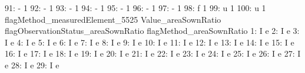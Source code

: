 \documentclass[nojss]{jss}
\begin{document}
\begin{Schunk}
\begin{Soutput}
 91:                               -                   1
 92:                               -                   1
 93:                               -                   1
 94:                               -                   1
 95:                               -                   1
 96:                               -                   1
 97:                               -                   1
 98:                               f                   1
 99:                               u                   1
100:                               u                   1
     flagMethod_measuredElement_5525 Value_areaSownRatio
     flagObservationStatus_areaSownRatio flagMethod_areaSownRatio
  1:                                   I                        e
  2:                                   I                        e
  3:                                   I                        e
  4:                                   I                        e
  5:                                   I                        e
  6:                                   I                        e
  7:                                   I                        e
  8:                                   I                        e
  9:                                   I                        e
 10:                                   I                        e
 11:                                   I                        e
 12:                                   I                        e
 13:                                   I                        e
 14:                                   I                        e
 15:                                   I                        e
 16:                                   I                        e
 17:                                   I                        e
 18:                                   I                        e
 19:                                   I                        e
 20:                                   I                        e
 21:                                   I                        e
 22:                                   I                        e
 23:                                   I                        e
 24:                                   I                        e
 25:                                   I                        e
 26:                                   I                        e
 27:                                   I                        e
 28:                                   I                        e
 29:                                   I                        e

\end{Soutput}
\end{Schunk}
\end{document}
